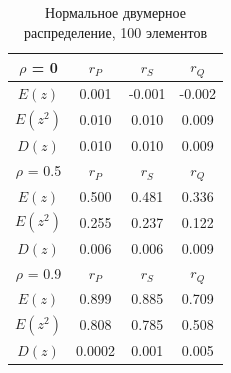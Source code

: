 \documentclass[12pt,a4paper]{article}
\begin{document}
			\begin{table}[htp]
			\label{coeffs_default_100}
				\begin{center}
					\begin{tabular}{|c|c|c|c|}
						\hline	
						$\rho$ = 0 & $r_P$ & $r_S$ & $r_Q$ \\ \hline
						$E(z)$ & 0.001 & -0.001 & -0.002 \\ \hline
						$E(z^2)$ & 0.010 & 0.010 & 0.009 \\ \hline
						$D(z)$ & 0.010 & 0.010 & 0.009 \\ \hline
						
						$\rho$ = 0.5 & $r_P$ & $r_S$ & $r_Q$ \\ \hline
						$E(z)$ & 0.500 & 0.481 & 0.336 \\ \hline
						$E(z^2)$ & 0.255 & 0.237 & 0.122 \\ \hline
						$D(z)$ & 0.006 & 0.006 & 0.009 \\ \hline
						
						$\rho$ = 0.9 & $r_P$ & $r_S$ & $r_Q$ \\ \hline
						$E(z)$ & 0.899 & 0.885 & 0.709 \\ \hline
						$E(z^2)$ & 0.808 & 0.785 & 0.508 \\ \hline
						$D(z)$ & 0.0002 & 0.001 & 0.005 \\ \hline
			
					\end{tabular}
				\end{center}
			\caption{Нормальное двумерное распределение, 100 элементов}
			\end{table}
			\newpage
		
\end{document}
